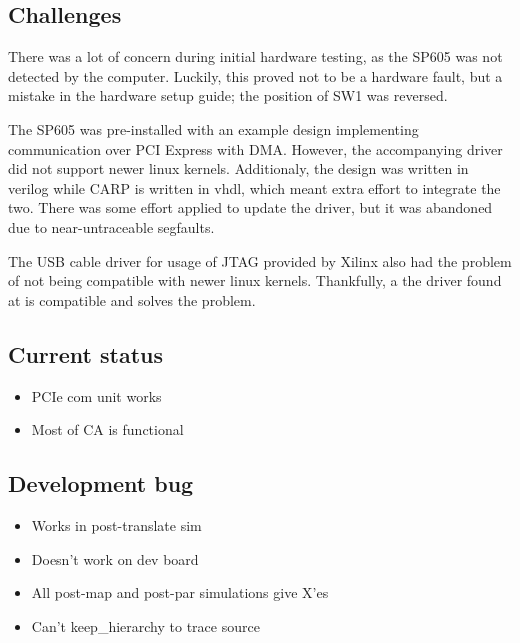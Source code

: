 \subsection{Challenges}

There was a lot of concern during initial hardware testing, as the SP605 was not detected by the computer.
Luckily, this proved not to be a hardware fault, but a mistake in the hardware setup guide; the position of SW1 was reversed.

The SP605 was pre-installed with an example design implementing communication over PCI Express with DMA.
However, the accompanying driver did not support newer linux kernels.
Additionaly, the design was written in verilog while CARP is written in vhdl, which meant extra effort to integrate the two.
There was some effort applied to update the driver, but it was abandoned due to near-untraceable segfaults.

The USB cable driver for usage of JTAG provided by Xilinx also had the problem of not being compatible with newer linux kernels.
Thankfully, a the driver found at \cite{usbdriver} is compatible and solves the problem.

\subsection{Current status}

\begin{itemize}
    \item PCIe com unit works
    \item Most of CA is functional
\end{itemize}

\subsection{Development bug}

\begin{itemize}
    \item Works in post-translate sim
    \item Doesn't work on dev board
    \item All post-map and post-par simulations give X'es
    \item Can't keep\_hierarchy to trace source
\end{itemize}

